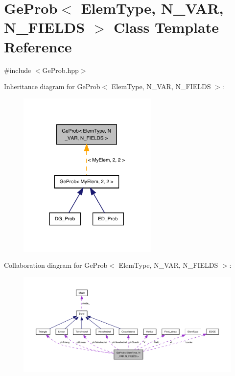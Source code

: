 \hypertarget{classGeProb}{}\section{Ge\+Prob$<$ Elem\+Type, N\+\_\+\+V\+AR, N\+\_\+\+F\+I\+E\+L\+DS $>$ Class Template Reference}
\label{classGeProb}


{\ttfamily \#include $<$Ge\+Prob.\+hpp$>$}



Inheritance diagram for Ge\+Prob$<$ Elem\+Type, N\+\_\+\+V\+AR, N\+\_\+\+F\+I\+E\+L\+DS $>$\+:
\nopagebreak
\begin{figure}[H]
\begin{center}
\leavevmode
\includegraphics[width=196pt]{classGeProb__inherit__graph}
\end{center}
\end{figure}


Collaboration diagram for Ge\+Prob$<$ Elem\+Type, N\+\_\+\+V\+AR, N\+\_\+\+F\+I\+E\+L\+DS $>$\+:
\nopagebreak
\begin{figure}[H]
\begin{center}
\leavevmode
\includegraphics[width=350pt]{classGeProb__coll__graph}
\end{center}
\end{figure}

